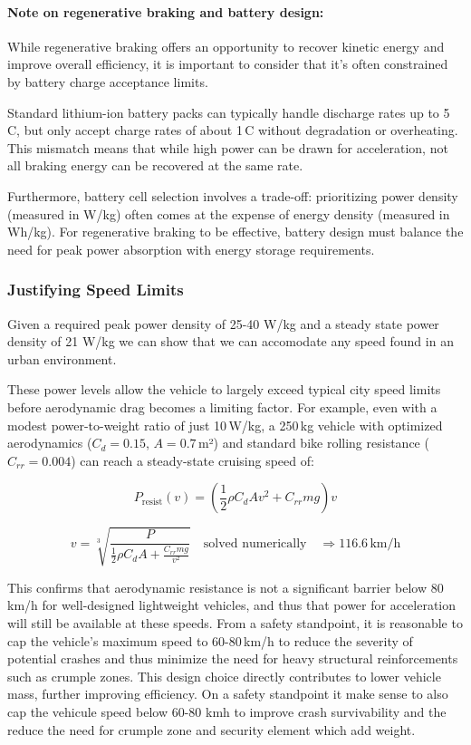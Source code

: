\paragraph{Note on regenerative braking and battery design:}

While regenerative braking offers an opportunity to recover kinetic energy and improve overall efficiency, it is important to consider that it's often constrained by battery charge acceptance limits.

Standard lithium-ion battery packs can typically handle discharge rates up to 5\,C, but only accept charge rates of about 1\,C without degradation or overheating. This mismatch means that while high power can be drawn for acceleration, not all braking energy can be recovered at the same rate.

Furthermore, battery cell selection involves a trade-off: prioritizing power density (measured in W/kg) often comes at the expense of energy density (measured in Wh/kg). For regenerative braking to be effective, battery design must balance the need for peak power absorption with energy storage requirements.


\subsubsection*{Justifying Speed Limits}

Given a required peak power density of 25-40 W/kg and a steady state power density of 21 W/kg we can show that we can accomodate any speed found in an urban environment.

These power levels allow the vehicle to largely exceed typical city speed limits before aerodynamic drag becomes a limiting factor. For example, even with a modest power-to-weight ratio of just 10\,W/kg, a 250\,kg vehicle with optimized aerodynamics ($C_d = 0.15$, $A = 0.7$\,m²) and standard bike rolling resistance ($C_{rr} = 0.004$) can reach a steady-state cruising speed of:

\[
P_{\text{resist}}(v) = (\frac{1}{2} \rho C_d A v^2 + C_{rr} m g) v
\]

\[
v = \sqrt[3]{\frac{P}{\frac{1}{2} \rho C_d A + \frac{C_{rr} m g}{v^2}}} \quad \text{solved numerically} \quad \Rightarrow \boxed{116.6 \, \text{km/h}}
\]

This confirms that aerodynamic resistance is not a significant barrier below 80\,km/h for well-designed lightweight vehicles, and thus that power for acceleration will still be available at these speeds. From a safety standpoint, it is reasonable to cap the vehicle's maximum speed to 60-80\,km/h to reduce the severity of potential crashes and thus minimize the need for heavy structural reinforcements such as crumple zones. This design choice directly contributes to lower vehicle mass, further improving efficiency. On a safety standpoint it make sense to also cap the vehicule speed below 60-80 kmh to improve crash survivability and the reduce the need for crumple zone and security element which add weight. \\

